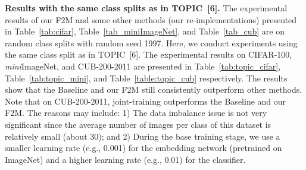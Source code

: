 \documentclass{article}
\begin{document}
\textbf{Results with the same class splits as in TOPIC~[6].}
The experimental results of our F2M and some other methods (our re-implementations) presented in Table~\ref{tab:cifar}, Table~\ref{tab_miniImageNet}, and Table~\ref{tab_cub} are on random class splits with random seed 1997. Here, we conduct experiments using the same class split as in TOPIC~[6]. The experimental results on CIFAR-100, \emph{mini}ImageNet, and CUB-200-2011 are presented in Table~\ref{tab:topic_cifar}, Table~\ref{tab:topic_mini}, and Table~\ref{table:topic_cub} respectively. The results show that 
the Baseline and our F2M still consistently outperform other methods. 
Note that on CUB-200-2011, joint-training outperforms the Baseline and our F2M. The reasons may include: 1) The data imbalance issue is not very significant since the average number of images per class of this dataset is relatively small (about 30); and 2) During the base training stage, we use a smaller learning rate (e.g., 0.001) for the embedding network (pretrained on ImageNet) and a higher learning rate (e.g., 0.01) for the classifier.
\end{document}

